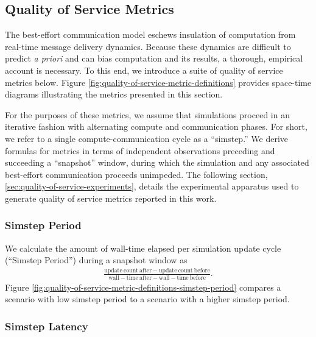 \subsection{Quality of Service Metrics} \label{sec:quality-of-service-metrics}



The best-effort communication model eschews insulation of computation from  real-time message delivery dynamics.
Because these dynamics are difficult to predict \textit{a priori} and can bias computation and its results, a thorough, empirical account is necessary.
To this end, we introduce a suite of quality of service metrics below.
Figure \ref{fig:quality-of-service-metric-definitions} provides space-time diagrams illustrating the metrics presented in this section.

For the purposes of these metrics, we assume that simulations proceed in an iterative fashion with alternating compute and communication phases.
For short, we refer to a single compute-communication cycle as a ``simstep.''
We derive formulas for metrics in terms of independent observations preceding and succeeding a ``snapshot'' window, during which the simulation and any associated best-effort communication proceeds unimpeded.
The following section, \ref{sec:quality-of-service-experiments}, details the experimental apparatus used to generate quality of service metrics reported in this work.

\subsubsection{Simstep Period} \label{sec:simstep-period-metric}

We calculate the amount of wall-time elapsed per simulation update cycle (``Simstep Period'') during a snapshot window as
\begin{align*}
\frac{
  \mathrm{update\ count\ after} - \mathrm{update\ count\ before}
}{
  \mathrm{wall-time\ after} - \mathrm{wall-time\ before}
}.
\end{align*}
Figure \ref{fig:quality-of-service-metric-definitions-simstep-period} compares a scenario with low simstep period to a scenario with a higher simstep period.

\subsubsection{Simstep Latency} \label{sec:wall-time-latency-metric}

